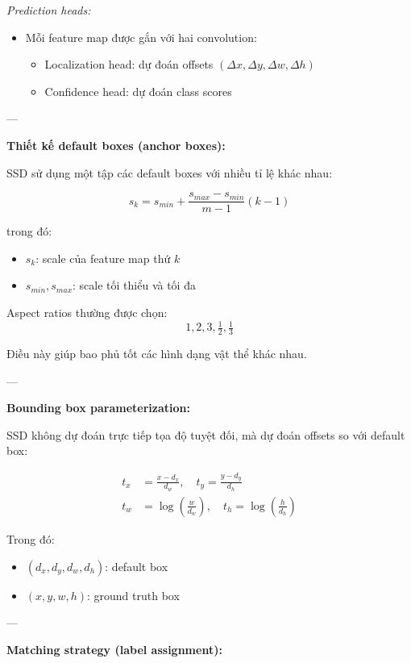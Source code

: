 \textit{Prediction heads:}
\begin{itemize}
	\item Mỗi feature map được gắn với hai convolution:
	\begin{itemize}
		\item Localization head: dự đoán offsets $(\Delta x, \Delta y, \Delta w, \Delta h)$
		\item Confidence head: dự đoán class scores
	\end{itemize}
\end{itemize}

---

\textbf{Thiết kế default boxes (anchor boxes):}

SSD sử dụng một tập các default boxes với nhiều tỉ lệ khác nhau:

\begin{equation}
	s_k = s_{min} + \frac{s_{max} - s_{min}}{m - 1} (k - 1)
\end{equation}

trong đó:
\begin{itemize}
	\item $s_k$: scale của feature map thứ $k$
	\item $s_{min}, s_{max}$: scale tối thiểu và tối đa
\end{itemize}

Aspect ratios thường được chọn:
\[
{1, 2, 3, \tfrac{1}{2}, \tfrac{1}{3}}
\]

Điều này giúp bao phủ tốt các hình dạng vật thể khác nhau.

---

\textbf{Bounding box parameterization:}

SSD không dự đoán trực tiếp tọa độ tuyệt đối, mà dự đoán offsets so với default box:

\begin{align}
	t_x &= \frac{x - d_x}{d_w}, \quad
	t_y = \frac{y - d_y}{d_h} \\
	t_w &= \log \left( \frac{w}{d_w} \right), \quad
	t_h = \log \left( \frac{h}{d_h} \right)
\end{align}

Trong đó:
\begin{itemize}
	\item $(d_x, d_y, d_w, d_h)$: default box
	\item $(x, y, w, h)$: ground truth box
\end{itemize}

---

\textbf{Matching strategy (label assignment):}

